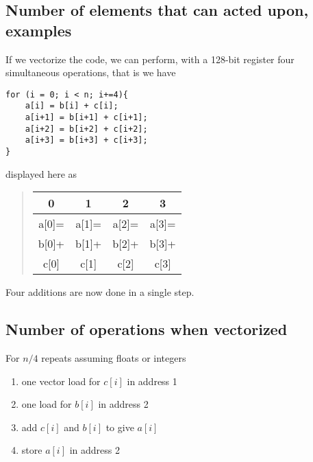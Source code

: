 \documentclass[%
oneside,                 %
final,                   %
10pt]{article}
\begin{document}
\noindent
\subsection*{Number of elements that can acted upon, examples}
If we vectorize the code, we can perform, with a 128-bit register four simultaneous operations, that is
we have







\begin{verbatim}
for (i = 0; i < n; i+=4){
    a[i] = b[i] + c[i];
    a[i+1] = b[i+1] + c[i+1];
    a[i+2] = b[i+2] + c[i+2];
    a[i+3] = b[i+3] + c[i+3];
}

\end{verbatim}

displayed here as


\begin{quote}
\begin{tabular}{cccc}
\hline
\multicolumn{1}{c}{ 0 } & \multicolumn{1}{c}{ 1 } & \multicolumn{1}{c}{ 2 } & \multicolumn{1}{c}{ 3 } \\
\hline
a[0]= & a[1]= & a[2]= & a[3]= \\
\hline
b[0]+ & b[1]+ & b[2]+ & b[3]+ \\
\hline
c[0]  & c[1]  & c[2]  & c[3]  \\
\hline
\end{tabular}
\end{quote}

\noindent
Four additions are now done in a single step.

\subsection*{Number of operations when vectorized}
For $n/4$ repeats assuming floats or integers
\begin{enumerate}
\item one vector load for $c[i]$ in address 1

\item one load for $b[i]$ in address 2

\item add $c[i]$ and $b[i]$ to give $a[i]$

\item store $a[i]$ in address 2
\end{enumerate}
\end{document}
